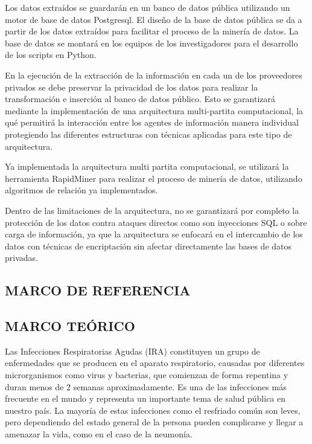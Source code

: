 \documentclass[a4paper, 11pt, oneside]{article}
\theoremstyle{definition}
\theoremstyle{remark}
\begin{document}
Los datos extraídos se guardarán en un banco de datos pública utilizando un motor de base de datos Postgresql. El diseño de la base de datos pública se da a partir de los datos extraídos para facilitar el proceso de la minería de datos. La base de datos se montará en los equipos de los  investigadores para el desarrollo de los scripts en Python.

En la ejecución de la extracción de la información en cada un de los proveedores privados se debe preservar la privacidad de los datos para realizar la transformación e inserción al banco de datos público. Esto se garantizará mediante la implementación de una arquitectura multi-partita computacional, la qué permitirá la interacción entre los agentes de información manera individual protegiendo las diferentes estructuras con técnicas aplicadas para este tipo de arquitectura.

Ya implementada la arquitectura multi partita computacional, se utilizará la herramienta RapidMiner para realizar el proceso de minería de datos, utilizando algoritmos de relación ya implementados.

Dentro de las limitaciones de la arquitectura, no se garantizará por completo la protección de los datos contra ataques directos como son inyecciones SQL o sobre carga de información, ya que la arquitectura se enfocará en el intercambio de los datos con técnicas de encriptación sin afectar directamente las bases de datos privadas. 

\clearpage

\begin{center}
 \section{MARCO DE REFERENCIA}
\end{center}

\subsection{MARCO TEÓRICO}


Las Infecciones Respiratorias Agudas (IRA) constituyen un grupo de enfermedades que se producen en el aparato respiratorio, causadas por diferentes microrganismos como virus y bacterias, que comienzan de forma repentina y duran menos de 2 semanas aproximadamente. Es una de las infecciones más frecuente en el mundo y representa un importante tema de salud pública en nuestro país.  La mayoría de estas infecciones como el resfriado común son leves, pero dependiendo del estado general de la persona pueden complicarse y llegar a amenazar la vida, como en el caso de la neumonía.
\end{document}
